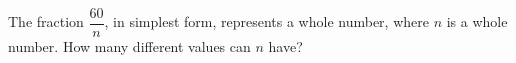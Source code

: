 The fraction $\dfrac{60}{n}$, in simplest form, represents a whole number, where $n$ is a whole number. How many different values can $n$ have?
